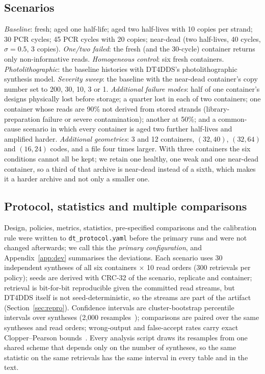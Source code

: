 \documentclass[acmsmall,screen]{acmart}
\begin{document}
\subsection{Scenarios}
\emph{Baseline}: fresh; aged one half-life; aged two half-lives with 10 copies per strand; 30
PCR cycles; 45 PCR cycles with 20 copies; near-dead (two half-lives, 40 cycles, $\sigma{=}0.5$,
3 copies).  \emph{One/two failed}: the fresh (and the 30-cycle) container returns only
non-informative reads.  \emph{Homogeneous control}: six fresh containers.
\emph{Photolithographic}: the baseline histories with DT4DDS's photolithographic synthesis
model.  \emph{Severity sweep}: the baseline with the near-dead container's copy number set to 200, 30, 10, 3
or 1.  \emph{Additional failure modes}: half of one container's designs physically lost before storage;
a quarter lost in each of two containers; one container whose reads are 90\% not derived from stored
strands (library-preparation failure or severe contamination); another at 50\%; and a common-cause
scenario in which every container is aged two further half-lives and amplified harder.
\emph{Additional geometries}: 3 and 12 containers, $(32,40)$, $(32,64)$ and $(16,24)$ codes, and a file
four times larger.  With three containers the six conditions cannot all be kept; we retain one healthy,
one weak and one near-dead container, so a third of that archive is near-dead instead of a sixth, which
makes it a harder archive and not only a smaller one.

\subsection{Protocol, statistics and multiple comparisons}\label{sec:eval-stats}
Design, policies, metrics, statistics, pre-specified comparisons and the calibration rule were written to
\texttt{dt\_protocol.yaml} before the primary runs and were not changed afterwards; we call this the
\emph{primary configuration}, and Appendix~\ref{app:dev} summarises the deviations.  Each scenario uses
30 independent syntheses of all six containers $\times$ 10 read orders (300 retrievals per policy); seeds
are derived with CRC-32 of the scenario, replicate and container; retrieval is bit-for-bit reproducible
given the committed read streams, but DT4DDS itself is not seed-deterministic, so the streams are part of
the artifact (Section~\ref{sec:repro}).  Confidence intervals are cluster-bootstrap percentile intervals
over syntheses (2{,}000 resamples~\cite{efron1993introduction}); comparisons are paired over the same
syntheses and read orders; wrong-output and false-accept rates carry exact Clopper--Pearson
bounds~\cite{clopper1934use}.  Every analysis script draws its resamples from one shared scheme that
depends only on the number of syntheses, so the same statistic on the same retrievals has the same
interval in every table and in the text.
\end{document}
